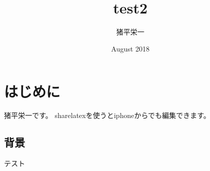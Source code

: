 \documentclass[12pt]{jarticle}
\title{test2}
\author{猪平栄一}
\date{August 2018}
\begin{document}
\maketitle

\section{はじめに}
猪平栄一です。
sharelatexを使うとiphoneからでも編集できます。

\subsection{背景}
テスト
\end{document}
